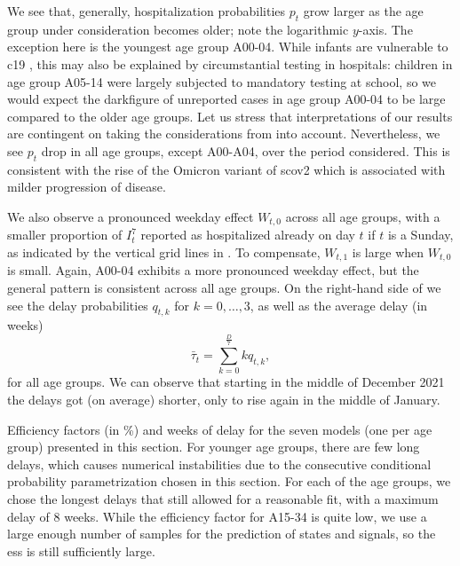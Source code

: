 We see that, generally, hospitalization probabilities $p_{t}$ grow larger as the age group under consideration becomes older; note the logarithmic $y$-axis. The exception here is the youngest age group A00-04. While infants are vulnerable to \acrshort{c19} \citep{Havers2024COVID19Associateda}, this may also be explained by circumstantial testing in hospitals: children in age group A05-14 were largely  subjected to mandatory testing at school, so we would expect the darkfigure of unreported cases in age group A00-04 to be large compared to the older age groups. Let us stress that interpretations of our results are contingent on taking the considerations from  into account. 
Nevertheless, we see $p_{t}$ drop in all age groups, except A00-A04, over the period considered. This is consistent with the rise of the Omicron variant of \acrshort{scov2} \citep{RobertKoch-Institut2024SARSCoV2b} which is associated with milder progression of disease. 

We also observe a pronounced weekday effect $W_{t,0}$ across all age groups, with a smaller proportion of $I^{7}_{t}$ reported as hospitalized already on day $t$ if $t$ is a Sunday, as indicated by the vertical grid lines in . To compensate, $W_{t,1}$ is large when $W_{t,0}$ is small. Again, A00-04 exhibits a more pronounced weekday effect, but the general pattern is consistent across all age groups. 
On the right-hand side of  we see the delay probabilities $q_{t,k}$ for $k=0, \dots, 3$, as well as the average delay (in weeks)
$$
    \bar \tau_{t} = \sum_{k = 0}^{\frac{D}{7}} k q_{t,k},
$$
for all age groups. We can observe that starting in the middle of December 2021 the delays got (on average) shorter, only to rise again in the middle of January. 

\begin{table}
    \centering
    
    \caption{Efficiency factors (in \%) and weeks of delay for the seven models (one per age group) presented in this section. For younger age groups, there are few long delays, which causes numerical instabilities due to the consecutive conditional probability parametrization chosen in this section. For each of the age groups, we chose the longest delays that still allowed for a reasonable fit, with a maximum delay of $8$ weeks. While the efficiency factor for A15-34 is quite low, we use a large enough number of samples for the prediction of states and signals, so the \acrshort{ess} is still sufficiently large.}
    \label{tab:hospitalization_showcase_ess}
\end{table}

